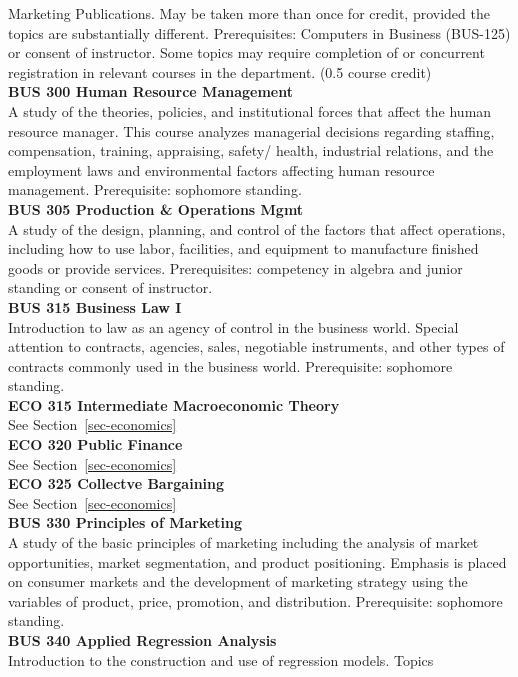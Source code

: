 \documentclass[
  letterpaper,
]{scrbook}
\begin{document}
Marketing Publications. May be taken more than once for credit, provided
the topics are substantially different. Prerequisites: Computers in
Business (BUS-125) or consent of instructor. Some topics may require
completion of or concurrent registration in relevant courses in the
department. (0.5 course credit)\\
\textbf{BUS 300 Human Resource Management}\\
A study of the theories, policies, and institutional forces that affect
the human resource manager. This course analyzes managerial decisions
regarding staffing, compensation, training, appraising, safety/ health,
industrial relations, and the employment laws and environmental factors
affecting human resource management. Prerequisite: sophomore standing.\\
\textbf{BUS 305 Production \& Operations Mgmt}\\
A study of the design, planning, and control of the factors that affect
operations, including how to use labor, facilities, and equipment to
manufacture finished goods or provide services. Prerequisites:
competency in algebra and junior standing or consent of instructor.\\
\textbf{BUS 315 Business Law I}\\
Introduction to law as an agency of control in the business world.
Special attention to contracts, agencies, sales, negotiable instruments,
and other types of contracts commonly used in the business world.
Prerequisite: sophomore standing.\\
\textbf{ECO 315 Intermediate Macroeconomic Theory}\\
See Section~\ref{sec-economics}\\
\textbf{ECO 320 Public Finance}\\
See Section~\ref{sec-economics}\\
\textbf{ECO 325 Collectve Bargaining}\\
See Section~\ref{sec-economics}\\
\textbf{BUS 330 Principles of Marketing}\\
A study of the basic principles of marketing including the analysis of
market opportunities, market segmentation, and product positioning.
Emphasis is placed on consumer markets and the development of marketing
strategy using the variables of product, price, promotion, and
distribution. Prerequisite: sophomore standing.\\
\textbf{BUS 340 Applied Regression Analysis}\\
Introduction to the construction and use of regression models. Topics
\end{document}
